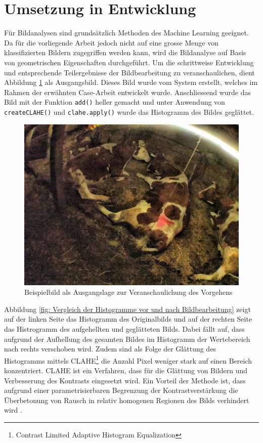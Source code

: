 \section{Umsetzung in Entwicklung}
Für Bildanalysen sind grundsätzlich Methoden des Machine Learning geeignet. Da für die vorliegende Arbeit jedoch nicht auf eine grosse Menge von klassifizierten Bildern zugegriffen werden kann, wird die Bildanalyse auf Basis von geometrischen Eigenschaften durchgeführt.
Um die schrittweise Entwicklung und entsprechende Teilergebnisse der Bildbearbeitung zu veranschaulichen, dient Abbildung \ref{fig: Ausgangslage für die Bildanalyse} als Ausgangsbild. Dieses Bild wurde vom System erstellt, welches im Rahmen der erwähnten Case-Arbeit entwickelt wurde. Anschliessend wurde das Bild mit der Funktion \texttt{add()} heller gemacht und unter Anwendung von \texttt{createCLAHE()} und \texttt{clahe.apply()} wurde das Histogramm des Bildes geglättet. 

\begin{figure}[H]
	\center
	\includegraphics[scale=0.43]{Grafiken/entwicklung/1ausgangsbildBericht.jpg}
	\caption{Beispielbild als Ausgangslage zur Veranschaulichung des Vorgehens} 
	\label{fig: Ausgangslage für die Bildanalyse}
\end{figure}

Abbildung \ref{fig: Vergleich der Histogramme vor und nach Bildbearbeitung} zeigt auf der linken Seite das Histogramm des Originalbilds und auf der rechten Seite das Histrogramm des aufgehellten und geglätteten Bilds. Dabei fällt auf, dass aufgrund der Aufhellung des gesamten Bildes im Histogramm der Wertebereich nach rechts verschoben wird. Zudem sind als Folge der Glättung des Histogramms mittels CLAHE\footnote{Contrast Limited Adaptive Histogram Equalization} die Anzahl Pixel weniger stark auf einen Bereich konzentriert. CLAHE ist ein Verfahren, dass für die Glättung von Bildern und Verbesserung des Kontrasts eingesetzt wird. Ein Vorteil der Methode ist, dass aufgrund einer parametrisierbaren Begrenzung der Kontrastverstärkung die Überbetonung von Rausch in relativ homogenen Regionen des Bilds verhindert wird \citep[S. 313]{FernandezVillan2019}.

